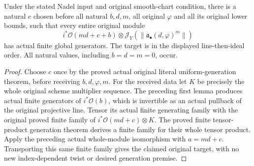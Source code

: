 \begin{theorem}
\label{thm:c0n-original-uniform-buffer-growth}
\leanok
{}
Under the stated Nadel input and original smooth-chart condition, there
is a natural $c$ chosen before all natural $b,d,m$, all original
$\varphi$ and all its original lower bounds, such that every entire
original module
\[
 i^*\mathcal O(md+c+b)\otimes
       \mathcal J_Y(\|\mathfrak a_\bullet(d,\varphi)^m\|)
\]
has actual finite global generators. The target is in the displayed
line-then-ideal order. All natural values, including $b=d=m=0$, occur.
\end{theorem}
\begin{proof}
Choose $c$ once by the proved actual original literal uniform-generation
theorem, before receiving $b,d,\varphi,m$. For the received data let $K$
be precisely the whole original scheme multiplier sequence. The preceding
first lemma produces actual finite generators of $i^*\mathcal O(b)$,
which is invertible as an actual pullback of the original projective line.
Tensor its actual finite generating family with the original proved finite
family of $i^*\mathcal O(md+c)\otimes K$. The proved finite tensor-product
generation theorem derives a finite family for their whole tensor product.
Apply the preceding actual whole-module isomorphism with $a=md+c$.
Transporting this same finite family gives the claimed original target,
with no new index-dependent twist or desired generation premise.
\end{proof}
